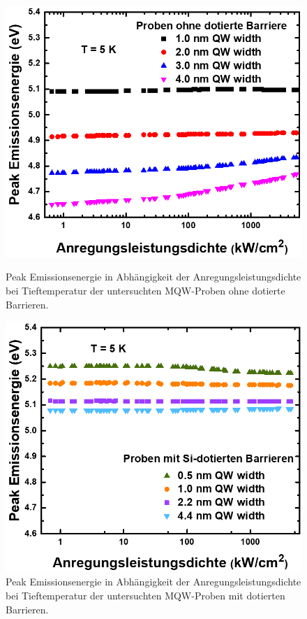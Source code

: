 %
\begin{figure}[H]
  \centering
  \begin{minipage}[t]{0.49\textwidth}
    \centering
    \includegraphics[width=\textwidth]{Bilder/MQWdickenSerie/PeakEnergieUndotiert.png}
		\caption{Peak Emissionsenergie in Abhängigkeit der Anregungsleistungsdichte bei Tieftemperatur der untersuchten MQW-Proben ohne dotierte Barrieren.}
    \label{fig:undotiertpeak}
  \end{minipage}
	\hfill
  \begin{minipage}[t]{0.49\textwidth}
    \centering
    \includegraphics[width=\linewidth]{Bilder/MQWdickenSerie/PeakEnergieDotiert.png}
		\caption{Peak Emissionsenergie in Abhängigkeit der Anregungsleistungsdichte bei Tieftemperatur der untersuchten MQW-Proben mit dotierten Barrieren.}
    \label{fig:dotiertpeak}
  \end{minipage}
\end{figure}
